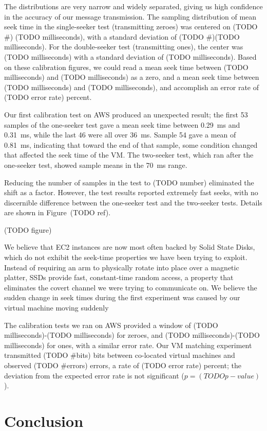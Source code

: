 \documentclass[conference]{IEEEtran}
\newcounter{todocnt}
\newcommand{\todo}[1]{\stepcounter{todocnt}{\tt {[#1]}} \marginpar{{$\blacksquare$ \thetodocnt}}}
\begin{document}
The distributions are very narrow and widely separated, giving us high confidence in the accuracy of our message
  transmission.
The sampling distribution of mean seek time in the single-seeker test (transmitting zeroes) was centered on (TODO \#)
  (TODO milliseconds), with a standard deviation of (TODO \#)(TODO milliseconds).
For the double-seeker test (transmitting ones), the center was (TODO milliseconds) with a standard deviation of (TODO
  milliseconds).
Based on these calibration figures, we could read a mean seek time between (TODO milliseconds) and (TODO milliseconds)
  as a zero, and a mean seek time between (TODO milliseconds) and (TODO milliseconds), and accomplish an error rate of
  (TODO error rate) percent.

Our first calibration test on AWS produced an unexpected result; the first \num{53} samples of the one-seeker test gave
  a mean seek time between \SI{0.29}{ms} and \SI{0.31}{ms}, while the last \num{46} were all over \SI{36}{ms}.
Sample \num{54} gave a mean of \SI{0.81}{ms}, indicating that toward the end of that sample, some condition changed
  that affected the seek time of the VM.
The two-seeker test, which ran after the one-seeker test, showed sample means in the \SI{70}{ms} range.

Reducing the number of samples in the test to (TODO number) eliminated the shift as a factor.
However, the test results reported extremely fast seeks, with no discernible difference between the one-seeker test and
  the two-seeker tests.
Details are shown in Figure~(TODO ref).

(TODO figure)

We believe that EC2 instances are now most often backed by Solid State Disks, which do not exhibit the seek-time
  properties we have been trying to exploit.
Instead of requiring an arm to physically rotate into place over a magnetic platter, SSDs provide fast, constant-time
  random access, a property that eliminates the covert channel we were trying to communicate on.
We believe the sudden change in seek times during the first experiment was caused by our virtual machine moving suddenly

The calibration tests we ran on AWS provided a window of (TODO milliseconds)-(TODO milliseconds) for zeroes, and (TODO
  milliseconds)-(TODO milliseconds) for ones, with a similar error rate.
Our VM matching experiment transmitted (TODO \#bits) bits between co-located virtual machines and observed
  (TODO \#errors) errors, a rate of (TODO error rate) percent; the deviation from the expected error rate is not
  significant ($p = (TODO p-value)$).

\section{Conclusion}
\todo{TBD last}



%
\end{document}
